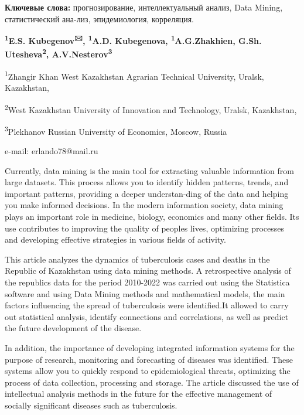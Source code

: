 {\bfseries Ключевые слова:} прогнозирование, интеллектуальный анализ, Data
Mining, статистический ана-лиз, эпидемиология, корреляция.


\begin{center}
{\bfseries \textsuperscript{1}E.S. Kubegenov\textsuperscript{🖂},
\textsuperscript{1}A.D. Kubegenova, \textsuperscript{1}A.G.Zhakhien,
G.Sh. Utesheva\textsuperscript{2}, A.V.Nesterov\textsuperscript{3}}

\textsuperscript{1}Zhangir Khan West Kazakhstan Agrarian Technical
University, Uralsk, Kazakhstan,

\textsuperscript{2}West Kazakhstan University of Innovation and
Technology, Uralsk, Kazakhstan,

\textsuperscript{3}Plekhanov Russian University of Economics, Moscow,
Russia

e-mail: erlando78@mail.ru
\end{center}

Currently, data mining is the main tool for extracting valuable
information from large datasets. This process allows you to identify
hidden patterns, trends, and important patterns, providing a deeper
understan-ding of the data and helping you make informed decisions. In
the modern information society, data mining plays an important role in
medicine, biology, economics and many other fields. Its use contributes
to improving the quality of people\textquotesingle s lives, optimizing
processes and developing effective strategies in various fields of
activity.

This article analyzes the dynamics of tuberculosis cases and deaths in
the Republic of Kazakhstan using data mining methods. A retrospective
analysis of the republic\textquotesingle s data for the period 2010-2022
was carried out using the Statistica software and using Data Mining
methods and mathematical models, the main factors influencing the spread
of tuberculosis were identified.It allowed to carry out statistical
analysis, identify connections and correlations, as well as predict the
future development of the disease.

In addition, the importance of developing integrated information systems
for the purpose of research, monitoring and forecasting of diseases was
identified. These systems allow you to quickly respond to
epidemiological threats, optimizing the process of data collection,
processing and storage. The article discussed the use of intellectual
analysis methods in the future for the effective management of socially
significant diseases such as tuberculosis.

